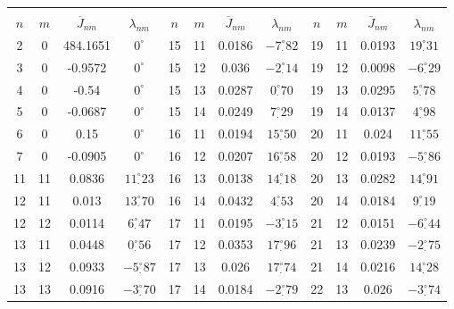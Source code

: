 \documentclass[12pt,reqno]{amsart}
\numberwithin{equation}{section}
\begin{document}
\begin{table}[h]
\begin{tabular}{|c|c|c|c||c|c|c|c||c|c|c|c|}
  \hline
  \\
  $n$ & $m$  & $\overline{J}_{nm}$ & $\lambda_{nm}$ & $n$ & $m$  & $\overline{J}_{nm}$ & $\lambda_{nm}$ &  $n$ & $m$  & $\overline{J}_{nm}$ & $\lambda_{nm}$ \\
  \hline
2 &0&484.1651&$0^{\circ}$   & 15& 11&  0.0186 & $-7_{\cdot}^{\circ}82$  &    19 &    11  &      0.0193 & $19_{\cdot}^{\circ}31$ \\
3 &0& -0.9572 & $0^{\circ}$ & 15 & 12   &  0.036 &     $-2_{\cdot}^{\circ}14$  &   19 & 12  &   0.0098 & $-6_{\cdot}^{\circ}29$\\
4 & 0 & -0.54 & $0^{\circ}$  & 15 & 13  &  0.0287 &   $ 0_{\cdot}^{\circ}70$  &    19 & 13    &  0.0295 &  $5_{\cdot}^{\circ}78$ \\
5 & 0&  -0.0687 &  $0^{\circ}$ & 15 & 14&  0.0249 &   $7_{\cdot}^{\circ}29$  &  19 & 14 & 0.0137 &      $4_{\cdot}^{\circ}98$  \\
6 &  0  &  0.15 & $0^{\circ}$ & 16 & 11 &  0.0194 & $15_{\cdot}^{\circ}50$  &  20 & 11 & 0.024 &    $11_{\cdot}^{\circ}55$ \\
7 & 0&  -0.0905 & $0^{\circ}$  & 16 & 12    &  0.0207 &  $16_{\cdot}^{\circ}58$  & 20 & 12 &   0.0193 &  $-5_{\cdot}^{\circ}86$  \\
11 & 11 &  0.0836 &  $11_{\cdot}^{\circ}23$ &  16 & 13& 0.0138 &$14_{\cdot}^{\circ}18$  & 20 & 13 &  0.0282 &  $14_{\cdot}^{\circ}91$  \\
12 & 11 &  0.013 &  $13_{\cdot}^{\circ}70$  & 16 & 14&  0.0432 & $4_{\cdot}^{\circ}53$    & 20 &  14 & 0.0184 &  $ 9_{\cdot}^{\circ}19 $\\
12 & 12 & 0.0114 &  $6_{\cdot}^{\circ}47$  & 17 & 11& 0.0195 & $-3_{\cdot}^{\circ}15$   & 21 &   12 & 0.0151 &  $-6_{\cdot}^{\circ}44$  \\
13 & 11 & 0.0448 &  $0_{\cdot}^{\circ}56$  & 17 & 12 & 0.0353 & $17_{\cdot}^{\circ}96$  & 21 &   13 & 0.0239 &  $-2_{\cdot}^{\circ}75$ \\
13 & 12 &  0.0933 & $-5_{\cdot}^{\circ}87$  & 17 & 13 &  0.026 &     $17_{\cdot}^{\circ}74$   & 21 & 14 & 0.0216 &   $ 14_{\cdot}^{\circ}28 $\\
13 & 13 &  0.0916 & $-3_{\cdot}^{\circ}70$   & 17 & 14 & 0.0184 &  $-2_{\cdot}^{\circ}79 $   & 22 & 13 & 0.026 &   $-3_{\cdot}^{\circ}74$ \\

\end{tabular}
\end{table}
\end{document}
